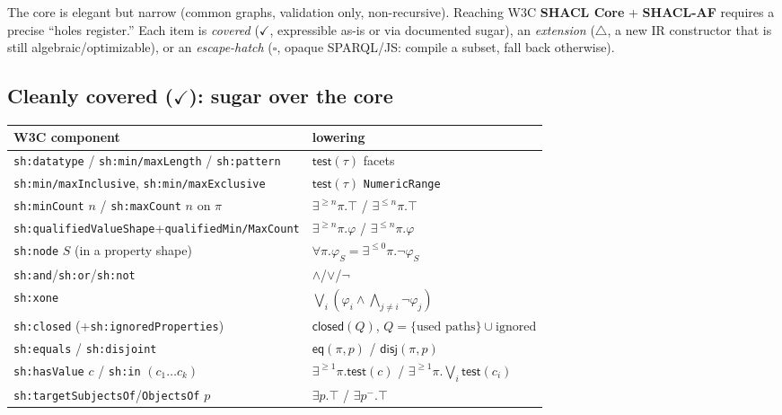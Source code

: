 \documentclass[11pt]{article}
\newcommand{\test}{\mathsf{test}}
\newcommand{\closedc}{\mathsf{closed}}
\newcommand{\eqc}{\mathsf{eq}}
\newcommand{\disjc}{\mathsf{disj}}
\newcommand{\code}[1]{\texttt{#1}}
\theoremstyle{definition}
\begin{document}
The core is elegant but narrow (common graphs, validation only, non-recursive).
Reaching W3C \textbf{SHACL Core} + \textbf{SHACL-AF} requires a precise
``holes register.'' Each item is \emph{covered} ($\checkmark$, expressible
as-is or via documented sugar), an \emph{extension} ($\triangle$, a new IR
constructor that is still algebraic/optimizable), or an \emph{escape-hatch}
($\square$, opaque SPARQL/JS: compile a subset, fall back otherwise).

\subsection{Cleanly covered ($\checkmark$): sugar over the core}
\begin{center}
\small
\begin{tabular}{@{}ll@{}}
\toprule
W3C component & lowering \\
\midrule
\code{sh:datatype} / \code{sh:min/maxLength} / \code{sh:pattern} & $\test(\tau)$ facets \\
\code{sh:min/maxInclusive}, \code{sh:min/maxExclusive} & $\test(\tau)$ \code{NumericRange} \\
\code{sh:minCount} $n$ / \code{sh:maxCount} $n$ on $\pi$ & $\exists^{\geq n}\pi.\top$ / $\exists^{\leq n}\pi.\top$ \\
\code{sh:qualifiedValueShape}+\code{qualifiedMin/MaxCount} & $\exists^{\geq n}\pi.\varphi$ / $\exists^{\leq n}\pi.\varphi$ \\
\code{sh:node} $S$ (in a property shape) & $\forall\pi.\varphi_S = \exists^{\leq0}\pi.\neg\varphi_S$ \\
\code{sh:and}/\code{sh:or}/\code{sh:not} & $\wedge$/$\vee$/$\neg$ \\
\code{sh:xone} & $\bigvee_i(\varphi_i\wedge\bigwedge_{j\neq i}\neg\varphi_j)$ \\
\code{sh:closed} (+\code{sh:ignoredProperties}) & $\closedc(Q)$, $Q=\{\text{used paths}\}\cup\text{ignored}$ \\
\code{sh:equals} / \code{sh:disjoint} & $\eqc(\pi,p)$ / $\disjc(\pi,p)$ \\
\code{sh:hasValue} $c$ / \code{sh:in} $(c_1\dots c_k)$ & $\exists^{\geq1}\pi.\test(c)$ / $\exists^{\geq1}\pi.\bigvee_i\test(c_i)$ \\
\code{sh:targetSubjectsOf}/\code{ObjectsOf} $p$ & $\exists p.\top$ / $\exists p^{-}.\top$ \\
\bottomrule
\end{tabular}
\end{center}
\end{document}
